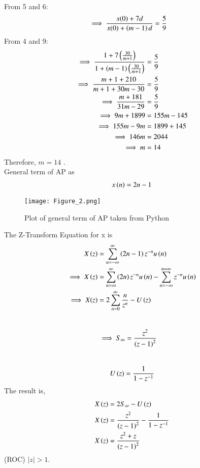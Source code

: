 \documentclass[journal,12pt,twocolumn]{IEEEtran}
\theoremstyle{remark}
\begin{document}
From 5 and 6:
\begin{align}
\implies \frac{x(0) + 7d}{x(0) + \left(m-1\right)d} &= \frac{5}{9} 
\end{align}
From 4 and 9:
\begin{align}
\implies \frac{1+7\left({\frac{30}{m+1}}\right)}{1+\left({m-1}\right)\left(\frac{30}{m+1}\right)} &= \frac{5}{9} \\
\implies \frac{m+1+210}{m+1+30m-30} &= \frac{5}{9}\\
\implies \frac{m+181}{31m-29} &= \frac{5}{9}\\
\implies 9m+1899 &=155m-145\\
\implies 155m-9m &=1899+145\\
\implies 146m &=2044\\
\implies m &=14
\end{align}
Therefore, $m = 14$ .\\
General term of AP as 
\begin{align}
    x\left(n\right)=2n-1
\end{align}
\begin{figure}[h]
    \centering
    \texttt{[image: Figure\_2.png]}
    \caption{Plot of general term of AP taken from Python}
    \label{fig:1}
\end{figure}
The Z-Transform Equation for x is 
\begin{align}
    X\left(z\right)&=\sum_{n=-\infty}^{\infty}\left(2n-1\right)z^{-n}u\left(n\right) \\ \implies X\left(z\right)&=\sum_{n=\infty}^{\infty}\left(2n\right)z^{-n}u\left(n\right) -\sum_{n=-\infty}^{n=\infty}z^{-n}u\left(n\right)\\
   \implies X(z)&=2\sum_{n=0}^{\infty}\dfrac{n}{z^{n}}-U\left(z\right)
\end{align}
\\
\begin{align}
   \implies S_\infty&=\dfrac{z^2}{\left(z-1\right)^{2}}
\end{align}
\\
\begin{align}
   U\left(z\right)=\dfrac{1}{1-z^{-1}}
\end{align}
The result is,
\begin{align}
    X\left(z\right)&=2S_\infty-U\left(z\right)\\
    X\left(z\right)&=\dfrac{z^2}{\left(z-1\right)^{2}}-\dfrac{1}{1-z^{-1}}\\
    X\left(z\right)&=\dfrac{z^2+z}{\left(z-1\right)^{2}}
\end{align}
(ROC) \(|z| > 1\).
\end{document}
